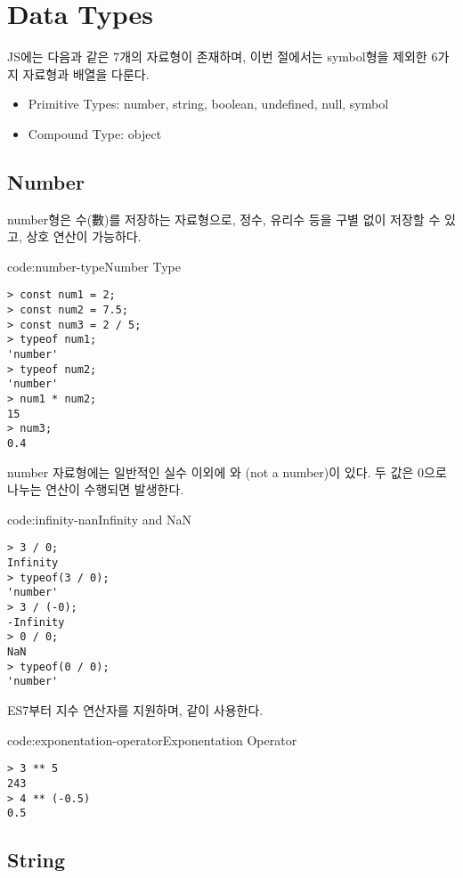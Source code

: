 \section{Data Types} \label{sect:data-types}

JS에는 다음과 같은 7개의 자료형이 존재하며, 이번 절에서는 symbol형을 제외한 6가지 자료형과 배열을 다룬다.

\begin{itemize}
    \item Primitive Types: number, string, boolean, undefined, null, symbol
    \item Compound Type: object
\end{itemize}

\subsection*{Number}

number형은 수(數)를 저장하는 자료형으로, 정수, 유리수 등을 구별 없이 저장할 수 있고, 상호 연산이 가능하다.

\begin{codeenv}{code:number-type}{Number Type}\begin{verbatim}
> const num1 = 2;
> const num2 = 7.5;
> const num3 = 2 / 5;
> typeof num1;
'number'
> typeof num2;
'number'
> num1 * num2;
15
> num3;
0.4
\end{verbatim}
\end{codeenv}

number 자료형에는 일반적인 실수 이외에 와 (not a number)이 있다. 두 값은 0으로 나누는 연산이 수행되면 발생한다.

\begin{codeenv}{code:infinity-nan}{Infinity and NaN}\begin{verbatim}
> 3 / 0;
Infinity
> typeof(3 / 0);
'number'
> 3 / (-0);
-Infinity
> 0 / 0;
NaN
> typeof(0 / 0);
'number'
\end{verbatim}
\end{codeenv}

ES7부터 지수 연산자를 지원하며, \와 같이 사용한다.

\begin{codeenv}{code:exponentation-operator}{Exponentation Operator}\begin{verbatim}
> 3 ** 5
243
> 4 ** (-0.5)
0.5
\end{verbatim}
\end{codeenv}

\subsection*{String}

